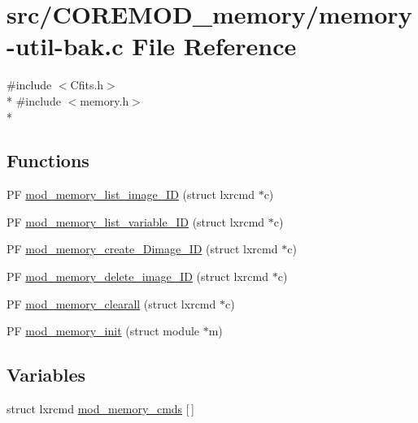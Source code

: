 \hypertarget{memory-util-bak_8c}{\section{src/\+C\+O\+R\+E\+M\+O\+D\+\_\+memory/memory-\/util-\/bak.c File Reference}
\label{memory-util-bak_8c}
}
{\ttfamily \#include $<$Cfits.\+h$>$}\\*
{\ttfamily \#include $<$memory.\+h$>$}\\*
\subsection*{Functions}
\begin{DoxyCompactItemize}
\item 
P\+F \hyperlink{memory-util-bak_8c_a726a603084661cdde9804771ed4effbd}{mod\+\_\+memory\+\_\+list\+\_\+image\+\_\+\+I\+D} (struct lxrcmd $\ast$c)
\item 
P\+F \hyperlink{memory-util-bak_8c_a2c9d01f20eaa6f60dad3250105d7a5ee}{mod\+\_\+memory\+\_\+list\+\_\+variable\+\_\+\+I\+D} (struct lxrcmd $\ast$c)
\item 
P\+F \hyperlink{memory-util-bak_8c_a568ab756155971ba66789611996a13e4}{mod\+\_\+memory\+\_\+create\+\_\+Dimage\+\_\+\+I\+D} (struct lxrcmd $\ast$c)
\item 
P\+F \hyperlink{memory-util-bak_8c_abc825a2ddf37777ae6925b242fdaac8f}{mod\+\_\+memory\+\_\+delete\+\_\+image\+\_\+\+I\+D} (struct lxrcmd $\ast$c)
\item 
P\+F \hyperlink{memory-util-bak_8c_a6ca5475168daaf1a7e36283ccbec5856}{mod\+\_\+memory\+\_\+clearall} (struct lxrcmd $\ast$c)
\item 
P\+F \hyperlink{memory-util-bak_8c_a40ae03fec034d9ae5dd46beeb878dc65}{mod\+\_\+memory\+\_\+init} (struct module $\ast$m)
\end{DoxyCompactItemize}
\subsection*{Variables}
\begin{DoxyCompactItemize}
\item 
struct lxrcmd \hyperlink{memory-util-bak_8c_a2cf116839ba2fdb2d9fed443b032d1ca}{mod\+\_\+memory\+\_\+cmds} \mbox{[}$\,$\mbox{]}
\end{DoxyCompactItemize}


